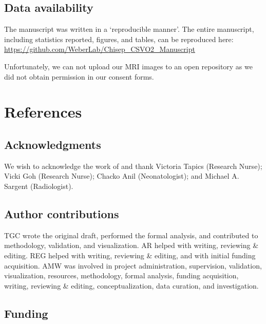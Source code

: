 \documentclass[
true
]{sn-jnl}
\begin{document}
\newpage{}

\subsection{Data availability}\label{data-availability}

The manuscript was written in a `reproducible manner'. The entire
manuscript, including statistics reported, figures, and tables, can be
reproduced here:
\url{https://github.com/WeberLab/Chisep_CSVO2_Manuscript}

Unfortunately, we can not upload our MRI images to an open repository as
we did not obtain permission in our consent forms.

\section*{References}\label{references}

\renewcommand{\bibsection}{}


\subsection{Acknowledgments}\label{acknowledgments}

We wish to acknowledge the work of and thank Victoria Tapics (Research
Nurse); Vicki Goh (Research Nurse); Chacko Anil (Neonatologist); and
Michael A. Sargent (Radiologist).

\subsection{Author contributions}\label{author-contributions}

TGC wrote the original draft, performed the formal analysis, and
contributed to methodology, validation, and visualization. AR helped
with writing, reviewing \& editing. REG helped with writing, reviewing
\& editing, and with initial funding acquisition. AMW was involved in
project administration, supervision, validation, visualization,
resources, methodology, formal analysis, funding acquisition, writing,
reviewing \& editing, conceptualization, data curation, and
investigation.

\subsection{Funding}\label{funding}
\end{document}
